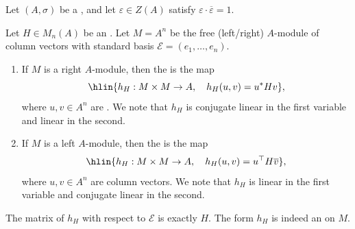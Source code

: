 \begin{definition} \label{definition:epsilon_hermitian_form_induced_by_an_epsilon_hermitian_matrix}
    Let $(A,\sigma)$ be a , and let $\varepsilon \in Z(A)$ satisfy $\varepsilon \cdot \overline{\varepsilon} = 1$.

    Let $H \in M_n(A)$ be an . Let $M = A^n$ be the free (left/right) $A$-module of column vectors with standard basis $\mathcal{E} = (e_1,\ldots,e_n)$.
    \begin{enumerate}
        \item If $M$ is a right $A$-module, then the  is the map
        $$\hlin{h_H: M \times M \to A, \quad h_H(u,v) = u^* H v},$$
        where $u,v \in A^n$ are . We note that $h_H$ is conjugate linear in the first variable and linear in the second.

        \item If $M$ is a left $A$-module, then the  is the map
        $$\hlin{h_H: M \times M \to A, \quad h_H(u,v) = u^\top H \overline{v}},$$
        where $u,v \in A^n$ are column vectors. We note that $h_H$ is linear in the first variable and conjugate linear in the second.

    \end{enumerate}


    The matrix of $h_H$ with respect to $\mathcal{E}$ is exactly $H$\TODO{}. The form $h_H$ is indeed an  on $M$.
\end{definition}
